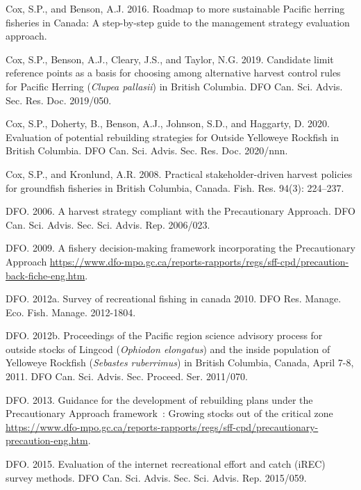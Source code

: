 \documentclass[11pt]{book}
\begin{document}
\leavevmode\hypertarget{ref-cox2016}{}%
Cox, S.P., and Benson, A.J. 2016. Roadmap to more sustainable Pacific herring fisheries in Canada: A step-by-step guide to the management strategy evaluation approach.

\leavevmode\hypertarget{ref-cox2019}{}%
Cox, S.P., Benson, A.J., Cleary, J.S., and Taylor, N.G. 2019. Candidate limit reference points as a basis for choosing among alternative harvest control rules for Pacific Herring (\emph{Clupea pallasii}) in British Columbia. DFO Can. Sci. Advis. Sec. Res. Doc. 2019/050.

\leavevmode\hypertarget{ref-cox2020}{}%
Cox, S.P., Doherty, B., Benson, A.J., Johnson, S.D., and Haggarty, D. 2020. Evaluation of potential rebuilding strategies for Outside Yelloweye Rockfish in British Columbia. DFO Can. Sci. Advis. Sec. Res. Doc. 2020/nnn.

\leavevmode\hypertarget{ref-cox2008a}{}%
Cox, S.P., and Kronlund, A.R. 2008. Practical stakeholder-driven harvest policies for groundfish fisheries in British Columbia, Canada. Fish. Res. 94(3): 224--237.

\leavevmode\hypertarget{ref-dfo2006}{}%
DFO. 2006. A harvest strategy compliant with the Precautionary Approach. DFO Can. Sci. Advis. Sec. Sci. Advis. Rep. 2006/023.

\leavevmode\hypertarget{ref-dfo2009}{}%
DFO. 2009. A fishery decision-making framework incorporating the Precautionary Approach \url{https://www.dfo-mpo.gc.ca/reports-rapports/regs/sff-cpd/precaution-back-fiche-eng.htm}.

\leavevmode\hypertarget{ref-dfo2012}{}%
DFO. 2012a. Survey of recreational fishing in canada 2010. DFO Res. Manage. Eco. Fish. Manage. 2012-1804.

\leavevmode\hypertarget{ref-dfo2012b}{}%
DFO. 2012b. Proceedings of the Pacific region science advisory process for outside stocks of Lingcod (\emph{Ophiodon elongatus}) and the inside population of Yelloweye Rockfish (\emph{Sebastes ruberrimus}) in British Columbia, Canada, April 7-8, 2011. DFO Can. Sci. Advis. Sec. Proceed. Ser. 2011/070.

\leavevmode\hypertarget{ref-dfo2013}{}%
DFO. 2013. Guidance for the development of rebuilding plans under the Precautionary Approach framework~: Growing stocks out of the critical zone \url{https://www.dfo-mpo.gc.ca/reports-rapports/regs/sff-cpd/precautionary-precaution-eng.htm}.

\leavevmode\hypertarget{ref-dfo2015}{}%
DFO. 2015. Evaluation of the internet recreational effort and catch (iREC) survey methods. DFO Can. Sci. Advis. Sec. Sci. Advis. Rep. 2015/059.
\end{document}

